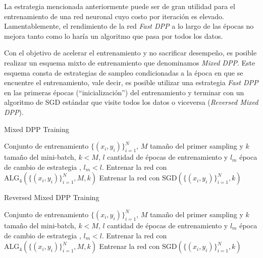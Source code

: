 La estrategia mencionada anteriormente puede ser de gran utilidad para el entrenamiento de una red neuronal cuyo costo por iteración es elevado. Lamentablemente, el rendimiento de la red \textit{Fast DPP} a lo largo de las épocas no mejora tanto como lo haría un algoritmo que pasa por todos los datos.

\vspace{0.2cm}

Con el objetivo de acelerar el entrenamiento y no sacrificar desempeño, es posible realizar un esquema mixto de entrenamiento que denominamos \textit{Mixed DPP}. Este esquema consta de estrategias de sampleo condicionadas a la época en que se encuentre el entrenamiento, vale decir, es posible utilizar una estrategia \textit{Fast DPP} en las primeras épocas (``inicialización'') del entrenamiento y terminar con un algoritmo de SGD estándar que visite todos los datos o viceversa (\textit{Reversed Mixed DPP}). 

\begin{algorithm}[ht]
\caption{Mixed DPP Training}\label{alg:alg5}
\begin{algorithmic}
\Require Conjunto de entrenamiento $\{(x_i,y_i) \}_{i=1}^N$, $M$ tamaño del primer sampling y $k$ tamaño del mini-batch, $k < M$, $l$ cantidad de épocas de entrenamiento y $l_m$ época de cambio de estrategia , $l_m < l$. 
\State Entrenar la red con $\text{ALG}_4(\{(x_i,y_i)\}_{i=1}^N , M, k)$
\Else
\State Entrenar la red con $\text{SGD}(\{(x_i,y_i) \}_{i=1}^N,k)$
\EndIf
\EndFor
\end{algorithmic}
\end{algorithm}

\begin{algorithm}[ht]
\caption{Reversed Mixed DPP Training}\label{alg:alg6}
\begin{algorithmic}
\Require Conjunto de entrenamiento $\{(x_i,y_i) \}_{i=1}^N$, $M$ tamaño del primer sampling y $k$ tamaño del mini-batch, $k < M$, $l$ cantidad de épocas de entrenamiento y $l_m$ época de cambio de estrategia , $l_m < l$. 
\State Entrenar la red con $\text{ALG}_4(\{(x_i,y_i)\}_{i=1}^N , M, k)$
\Else
\State Entrenar la red con $\text{SGD}(\{(x_i,y_i) \}_{i=1}^N,k)$
\EndIf
\EndFor
\end{algorithmic}
\end{algorithm}

\vspace{0.2cm}

